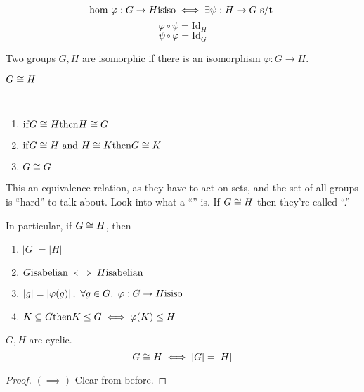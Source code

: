 \documentclass[12pt]{article}
\newcommand{\order}[1]{\left\lvert#1\right\rvert}
\newcommand{\id}[1][]{\mathrm{Id}}
\newcommand\subgroup{\le}
\newcommand\vphi{\varphi}
\begin{document}
\bboxcoro
\begin{coro}
    \[
        \T{hom }\vphi : G\to H\is\T{iso}
        \iff\exists\psi:H\to G\st
    \]
    \[
        \vphi\circ\psi=\id_H
    \]
    \[
        \psi\circ\vphi=\id_G
    \]
\end{coro}
\ebox

\bboxdefn
\begin{defn}
    Two groups \(G,H\) are isomorphic if there is an isomorphism \(\vphi:G\to H\).
    \bboxnota
    \begin{nota}
        \(G\cong H\)
    \end{nota}
    \ebox
\end{defn}
\ebox

\bboxnote
\begin{note}\ 
    \begin{enumerate}
        \item \(\mathrm{if} G\cong H\mathrm{then} H\cong G\)
        \item \(\mathrm{if} G\cong H\mathrm{\ and\ }H\cong K\mathrm{then} G\cong K\)
        \item \(G\cong G\)
    \end{enumerate}
    This  an equivalence relation, as they have to act on sets,
    and the set of all groups is ``hard'' to talk about. Look into what a
    ``\TB{proper class}'' is. If \(G\cong H\) then they're called ``.''

    In particular, if \(G\cong H\), then
    \begin{enumerate}
        \item \(\order{G}=\order{H}\)
        \item \(G\mathrm{is}\mathrm{abelian}\iff H\mathrm{is}\mathrm{abelian}\)
        \item \(\order{g}=\order{\vphi(g)},\ \forall g\in G,\
            \vphi:G\to H\is\TR{iso}\)
        \item \(K\ssq G\tthen K\subgroup G\iff\vphi(K)\subgroup H\)
    \end{enumerate}
\end{note}
\ebox


\bboxprop
\begin{prop}
    \(G,H\) are cyclic.
    \[
        G \isom H \iff \order{G} = \order{H}
    \]
\end{prop}
\ebox

\bboxproof
\begin{proof}
    \((\implies)\) Clear from before.
\end{proof}
\ebox
\end{document}
